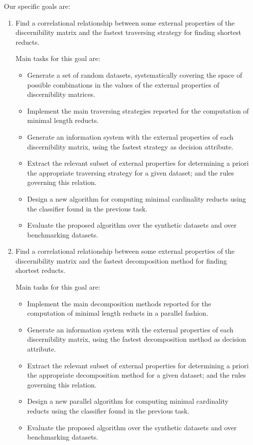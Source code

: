 \documentclass[11pt,authoryear]{elsarticle}
\begin{document}
  Our specific goals are:
  \begin{enumerate}
  \item Find a correlational relationship between some external properties of the discernibility matrix and the fastest 
  		traversing strategy for finding shortest reducts.
  		
  		Main tasks for this goal are:
  		\begin{itemize}
  		\item Generate a set of random datasets, systematically covering the space of possible combinations in 
  			  the values of the external properties of discernibility matrices.
  		\item Implement the main traversing strategies reported for the computation of minimal length reducts.
  		\item Generate an information system with the external properties of each discernibility matrix, using 
  			  the fastest strategy as decision attribute.
  		\item Extract the relevant subset of external properties for determining a priori the appropriate 
  			  traversing strategy for a given dataset; and the rules governing this relation.
  		\item Design a new algorithm for computing minimal cardinality reducts using the classifier found in
  			  the previous task.
  		\item Evaluate the proposed algorithm over the synthetic datasets and over benchmarking datasets.
  		\end{itemize}
  	
  \item Find a correlational relationship between some external properties of the discernibility matrix and the fastest 
  		decomposition method for finding shortest reducts.
  		
  		Main tasks for this goal are:
  		\begin{itemize}
  		\item Implement the main decomposition methods reported for the computation of minimal length reducts
  			  in a parallel fashion.
  		\item Generate an information system with the external properties of each discernibility matrix, using 
  			  the fastest decomposition method as decision attribute.
  		\item Extract the relevant subset of external properties for determining a priori the appropriate 
  			  decomposition method for a given dataset; and the rules governing this relation.
  		\item Design a new parallel algorithm for computing minimal cardinality reducts using the classifier 
  			  found in the previous task.
  		\item Evaluate the proposed algorithm over the synthetic datasets and over benchmarking datasets.
  		\end{itemize}
  

\end{enumerate}
\end{document}
